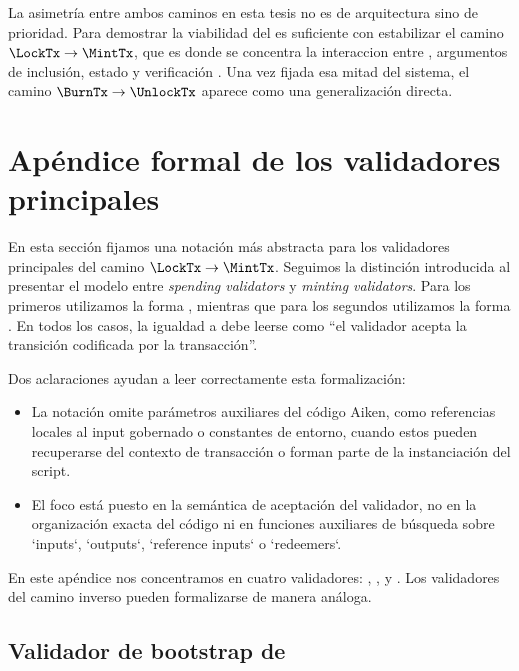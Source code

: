 La asimetría entre ambos caminos en esta tesis no es de arquitectura sino de prioridad. Para demostrar la viabilidad del \zkBridge es suficiente con estabilizar el camino $\LockTx \rightarrow \MintTx$, que es donde se concentra la interaccion entre \Mithril, argumentos de inclusión, estado \eUTxO y verificación \Groth \Onchain. Una vez fijada esa mitad del sistema, el camino $\BurnTx \rightarrow \UnlockTx$ aparece como una generalización directa.

\section{Apéndice formal de los validadores principales}

En esta sección fijamos una notación más abstracta para los validadores principales del camino $\LockTx \rightarrow \MintTx$. Seguimos la distinción introducida al presentar el modelo \eUTxO entre \textit{spending validators} y \textit{minting validators}. Para los primeros utilizamos la forma \SpendValidatorSchema, mientras que para los segundos utilizamos la forma \MintValidatorSchema. En todos los casos, la igualdad a \True debe leerse como ``el validador acepta la transición codificada por la transacción''.

Dos aclaraciones ayudan a leer correctamente esta formalización:

\begin{itemize}[noitemsep]
  \item La notación omite parámetros auxiliares del código Aiken, como referencias locales al input gobernado o constantes de entorno, cuando estos pueden recuperarse del contexto de transacción o forman parte de la instanciación del script.
  \item El foco está puesto en la semántica de aceptación del validador, no en la organización exacta del código ni en funciones auxiliares de búsqueda sobre `inputs`, `outputs`, `reference inputs` o `redeemers`.
\end{itemize}

En este apéndice nos concentramos en cuatro validadores: \StakeDistributionMintValidator, \StakeDistributionSpendValidator, \MintingValidator y \TxsUpdaterMintingValidator. Los validadores del camino inverso pueden formalizarse de manera análoga. 

\subsection{Validador de bootstrap de \StakeDistribution}

